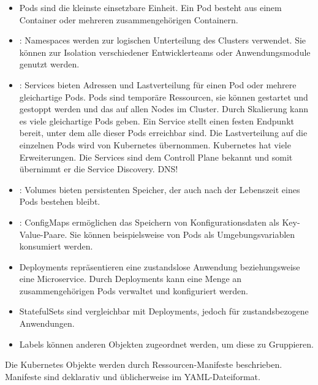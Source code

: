 \begin{itemize}
\item Pods sind die kleinste einsetzbare Einheit. Ein Pod besteht aus einem Container oder mehreren zusammengehörigen Containern.
\item: Namespaces werden zur logischen Unterteilung des Clusters verwendet. Sie können zur Isolation verschiedener Entwicklerteams oder Anwendungsmodule genutzt werden.
\item: Services bieten Adressen und Lastverteilung für einen Pod oder mehrere gleichartige Pods. Pods sind temporäre Ressourcen, sie können gestartet und gestoppt werden und das auf allen Nodes im Cluster. Durch Skalierung kann es viele gleichartige Pods geben. Ein Service stellt einen festen Endpunkt bereit, unter dem alle dieser Pods erreichbar sind. Die Lastverteilung auf die einzelnen Pods wird von Kubernetes übernommen. Kubernetes hat viele Erweiterungen. Die Services sind dem Controll Plane bekannt und somit übernimmt er die Service Discovery. DNS!
\item: Volumes bieten persistenten Speicher, der auch nach der Lebenszeit eines Pods bestehen bleibt.
\item: ConfigMaps ermöglichen das Speichern von Konfigurationsdaten als Key-Value-Paare. Sie können beispielsweise von Pods als Umgebungsvariablen konsumiert werden.
\item Deployments repräsentieren eine zustandslose Anwendung beziehungsweise eine Microservice. Durch Deployments kann eine Menge an zusammengehörigen Pods verwaltet und konfiguriert werden. 
\item StatefulSets sind vergleichbar mit Deployments, jedoch für zustandsbezogene Anwendungen.
\item Labels können anderen Objekten zugeordnet werden, um diese zu Gruppieren.
\end{itemize}

Die Kubernetes Objekte werden durch Ressourcen-Manifeste beschrieben. Manifeste
sind deklarativ und üblicherweise im YAML-Dateiformat.

%
%
%
%
%

